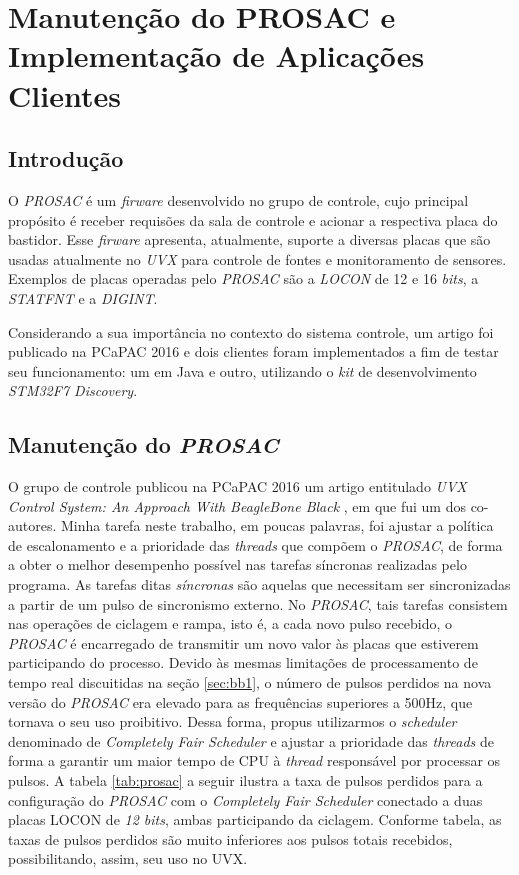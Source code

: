 \section {Manutenção do PROSAC e Implementação de Aplicações Clientes}

\subsection{Introdução}

O \textit{PROSAC} é um \textit{firware} desenvolvido no grupo de controle, cujo
principal propósito é receber requisões da sala de controle e acionar a
respectiva placa do bastidor. Esse \textit{firware} apresenta, atualmente,
suporte a diversas placas que são usadas atualmente no \textit{UVX} para
controle de fontes e monitoramento de sensores. Exemplos de placas operadas pelo
\textit{PROSAC} são a \textit{LOCON} de 12 e 16 \textit{bits}, a
\textit{STATFNT} e a \textit{DIGINT}.

\vspace{12px}

Considerando a sua importância no contexto do sistema controle, um artigo
foi publicado na PCaPAC 2016 e dois clientes foram implementados a fim de testar
seu funcionamento: um em Java e outro, utilizando o \textit{kit} de
desenvolvimento \textit{STM32F7 Discovery}.

\subsection {Manutenção do \textit{PROSAC}}

O grupo de controle publicou na PCaPAC 2016 um artigo entitulado \textit{UVX
Control System: An Approach With BeagleBone Black} \cite{pcapac2016}, em que fui
um dos co-autores. Minha tarefa neste trabalho, em poucas palavras, foi ajustar
a política de escalonamento e a prioridade das \textit{threads} que compõem o
\textit{PROSAC}, de forma a obter o melhor desempenho possível nas tarefas
síncronas realizadas pelo programa. As tarefas ditas \textit{síncronas}
são aquelas que necessitam ser sincronizadas a partir de um pulso de sincronismo
externo. No \textit{PROSAC}, tais tarefas consistem nas operações de ciclagem e
rampa, isto é, a cada novo pulso recebido, o \textit{PROSAC} é encarregado de
transmitir um novo valor às placas que estiverem participando do processo.
Devido às mesmas limitações de processamento de tempo real discuitidas na seção
\ref{sec:bb1}, o número de pulsos perdidos na nova versão do \textit{PROSAC} era
elevado para as frequências superiores a 500Hz, que tornava o seu uso
proibitivo. Dessa forma, propus utilizarmos o \textit{scheduler} denominado de
\textit{Completely Fair Scheduler} e ajustar a prioridade das \textit{threads}
de forma a garantir um maior tempo de CPU à \textit{thread} responsável por
processar os pulsos. A tabela \ref{tab:prosac} a seguir ilustra a taxa de pulsos
perdidos para a configuração do \textit{PROSAC} com o \textit{Completely Fair
Scheduler} conectado a duas placas LOCON de \textit{12 bits}, ambas
participando da ciclagem. Conforme tabela, as taxas de pulsos perdidos são muito
inferiores aos pulsos totais recebidos, possibilitando, assim, seu uso no UVX.

